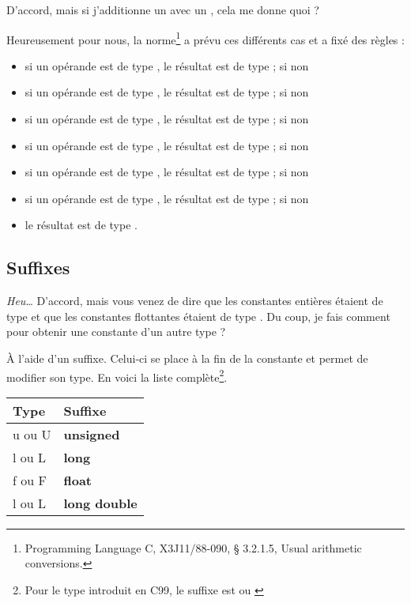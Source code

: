 \begin{questionbox}
D'accord, mais si j'additionne un
 avec un , cela me donne quoi ?
\end{questionbox}

Heureusement pour nous, la norme\footnote{Programming Language C,
  X3J11/88-090, § 3.2.1.5, Usual arithmetic conversions.} a prévu ces
différents cas et a fixé des règles :

\begin{itemize}
\item
  si un opérande est de type , le résultat est de
  type  ; si non
\item
  si un opérande est de type , le résultat est de type
   ; si non
\item
  si un opérande est de type , le résultat est de type
   ; si non
\item
  si un opérande est de type , le résultat est de
  type ; si non
\item
  si un opérande est de type , le résultat est de type
  ; si non
\item
  si un opérande est de type , le résultat est de
  type ; si non
\item
  le résultat est de type .
\end{itemize}

\subsection{Suffixes}
\label{suffixes}

\begin{questionbox}
\emph{Heu}\ldots{} D'accord, mais vous
venez de dire que les constantes entières étaient de type 
et que les constantes flottantes étaient de type . Du
coup, je fais comment pour obtenir une constante d'un autre type ?
\end{questionbox}

À l'aide d'un suffixe. Celui-ci se place à la fin de la constante et
permet de modifier son type. En voici la liste complète\footnote{\footnotesize{Pour le
  type  introduit en C99, le suffixe est 
  ou }}.


\begin{table}[ht!]
\centering
 \begin{tabular}{|l|l|}\hline
\rowcolor{gris-tab-entete}\textbf{Type} & \textbf{Suffixe}\tabularnewline\hline
\rowcolor{gris-clair-tab}u ou U & \textbf{unsigned}\tabularnewline\hline
l ou L & \textbf{long}\tabularnewline\hline
\rowcolor{gris-clair-tab}f ou F & \textbf{float}\tabularnewline\hline
l ou L & \textbf{long double}\tabularnewline\hline
 \end{tabular}
\end{table}

